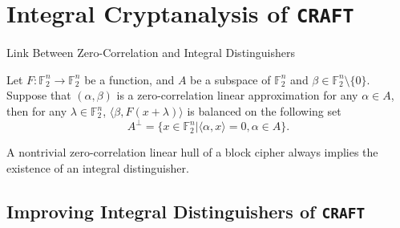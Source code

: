 \documentclass{beamer}
\begin{document}
\section{Integral Cryptanalysis of \texttt{CRAFT}}
\begin{frame}{Link Between Zero-Correlation and Integral Distinguishers}
\begin{theorem}
\label{linking_zc_to_integral}
\cite{linkZCtoIntergal} Let $F:\mathbb{F}_{2}^{n}\rightarrow \mathbb{F}_{2}^{n}$ be a function, and $A$ be a subspace of $\mathbb{F}_{2}^{n}$ and $\beta\in \mathbb{F}_{2}^{n} \setminus \{0\}$. Suppose that $(\alpha, \beta)$ is a zero-correlation linear approximation for any $\alpha \in A$, then for any $\lambda \in \mathbb{F}_{2}^{n}$, $\langle \beta, F(x + \lambda) \rangle$ is balanced on the following set 
\begin{equation*}
    A^{\bot} = \{x\in \mathbb{F}_{2}^{n} | \langle \alpha, x \rangle = 0, \alpha \in A\}.
\end{equation*}
\end{theorem}
\begin{theorem}
\label{link_nontrivial_zc_to_integral}
\cite{linkZCtoIntergal} A nontrivial zero-correlation linear hull of a block cipher always implies the existence of an integral distinguisher.
\end{theorem}
\end{frame}

\subsection{Improving Integral Distinguishers of \texttt{CRAFT}}
\end{document}
